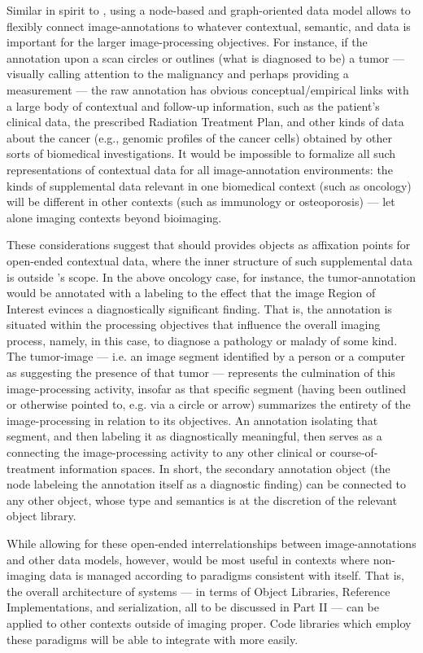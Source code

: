 {\begin{description}
Similar in spirit to \DICOMSR{}, using a node-based and 
graph-oriented data model allows \AXFI{} to 
flexibly connect image-annotations to 
whatever contextual, semantic, and  
data is important for the larger image-processing 
objectives.  For instance, if the annotation upon 
a \CT{} scan circles or outlines (what is 
diagnosed to be) a tumor --- visually 
calling attention to the malignancy and perhaps 
providing a measurement --- the raw annotation 
has obvious conceptual/empirical links with 
a large body of contextual and follow-up 
information, such as the patient's clinical 
data, the prescribed Radiation Treatment Plan, 
and other kinds of data about the cancer 
(e.g., genomic profiles of the cancer cells) 
obtained by other sorts of biomedical investigations.  
It would be impossible to formalize all 
such representations of contextual data for 
all image-annotation environments: the kinds 
of supplemental data relevant in one biomedical 
context (such as oncology) will be 
different in other contexts (such as 
immunology or osteoporosis) --- let alone 
imaging contexts beyond bioimaging.    
 
These considerations suggest that \AXFI{} 
should provides objects as affixation 
points for open-ended contextual 
data, where the inner structure of such 
supplemental data is outside \AXFI{}'s 
scope.  In the above oncology 
case, for instance, the tumor-annotation 
would be annotated with a labeling 
to the effect that the image Region of 
Interest evinces a diagnostically significant 
finding.  That is, the annotation is situated 
within the processing objectives that 
influence the overall imaging process, namely, 
in this case, to diagnose a pathology or 
malady of some kind.  The tumor-image --- 
i.e. an image segment identified by a person 
or a computer as suggesting the presence of that  
tumor --- represents the culmination of this 
image-processing activity, insofar as that 
specific segment (having been outlined or 
otherwise pointed to, e.g. via a circle or 
arrow) summarizes the entirety of the 
image-processing in relation to its 
objectives.  An annotation isolating that 
segment, and then labeling it as 
diagnostically meaningful, then serves as a 
 connecting the image-processing 
activity to any other clinical or course-of-treatment 
information spaces.  In short, the secondary 
annotation object (the node labeleing the 
annotation itself as a diagnostic finding) 
can be connected to any other object, whose 
type and semantics is at the discretion 
of the relevant \AXFI{} object library.

While allowing for these open-ended interrelationships 
between image-annotations and other data models, 
however, \AXFI{} would be most useful in contexts 
where non-imaging data is managed according to paradigms 
consistent with \AXFI{} itself.   That is, the 
overall architecture of \AXFI{} systems --- in terms 
of \AXFI{} Object Libraries, Reference Implementations, 
and  serialization, all to be 
discussed in Part II --- can be applied to 
other contexts outside of imaging proper.  
Code libraries which employ these paradigms 
will be able to integrate with \AXFI{} more easily. 
\end{description}
}







